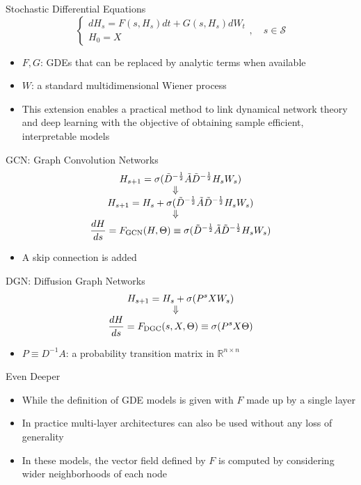 \documentclass{beamer}
\begin{document}
\begin{frame}{Stochastic Differential Equations}
\[
\begin{cases}
dH_{s}=F(s,H_s)dt+G(s,H_s)dW_t\\
H_0=X
\end{cases},\quad s\in\mathbb{\mathcal{S}}
\]
\begin{itemize}
\item $F,G$: GDEs that can be replaced by analytic terms when available
\item $W$: a standard multidimensional Wiener process
\item This extension enables a practical method to link dynamical network theory and deep learning with the objective of obtaining sample efficient, interpretable models
\end{itemize}
\end{frame}

\begin{frame}{GCN: Graph Convolution Networks}
\begin{gather*}
H_{s+1}=\sigma(\tilde{D}^{-\frac{1}{2}}\tilde{A}\tilde{D}^{-\frac{1}{2}}H_sW_s)\\
\ArrowBetweenLines[\Downarrow]
H_{s+1}=H_s+\sigma(\tilde{D}^{-\frac{1}{2}}\tilde{A}\tilde{D}^{-\frac{1}{2}}H_sW_s)\\
\ArrowBetweenLines[\Downarrow]
\frac{dH}{ds}=F_\text{GCN}(H,\Theta)\equiv\sigma(\tilde{D}^{-\frac{1}{2}}\tilde{A}\tilde{D}^{-\frac{1}{2}}H_sW_s)
\end{gather*}
\begin{itemize}
\item A skip connection is added
\end{itemize}
\end{frame}

\begin{frame}{DGN: Diffusion Graph Networks}
\begin{gather*}
H_{s+1}=H_s+\sigma(P^sXW_s)\\
\ArrowBetweenLines[\Downarrow]
\frac{dH}{ds}=F_\text{DGC}(s,X,\Theta)\equiv\sigma(P^sX\Theta)
\end{gather*}
\begin{itemize}
\item $P\equiv D^{-1}A$: a probability transition matrix in $\mathbb{R}^{n\times n}$
\end{itemize}
\end{frame}

\begin{frame}{Even Deeper}
\begin{itemize}
\item While the definition of GDE models is given with $F$ made up by a single layer
\item In practice multi-layer architectures can also be used without any loss of generality
\item In these models, the vector field defined by $F$ is computed by considering wider neighborhoods of each node
\end{itemize}
\end{frame}
\end{document}
